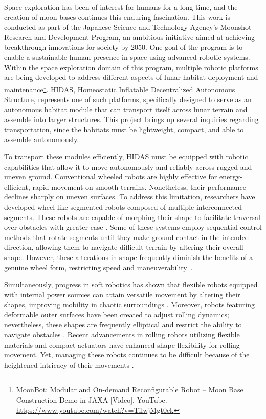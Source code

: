 \documentclass[a4paper, 10pt, conference]{ieeeconf}
\begin{document}
Space exploration has been of interest for humans for a long time, and the creation of moon bases continues this enduring fascination\cite{b17}. This work is conducted as part of the Japanese Science and Technology Agency's Moonshot Research and Development Program, an ambitious initiative aimed at achieving breakthrough innovations for society by 2050. One goal of the program is to enable a sustainable human presence in space using advanced robotic systems. Within the space exploration domain of this program, multiple robotic platforms are being developed to address different aspects of lunar habitat deployment and maintenance\footnote{MoonBot: Modular and On-demand Reconfigurable Robot -- Moon Base Construction Demo in JAXA [Video]. YouTube. \url{https://www.youtube.com/watch?v=TilwjMgt0ek}}. HIDAS, Homeostatic Inflatable Decentralized Autonomous Structure, represents one of such platforms, specifically designed to serve as an autonomous habitat module that can transport itself across lunar terrain and assemble into larger structures. This project brings up several inquiries regarding transportation, since the habitats must be lightweight, compact, and able to assemble autonomously.

To transport these modules efficiently, HIDAS must be equipped with robotic capabilities that allow it to move autonomously and reliably across rugged and uneven ground. Conventional wheeled robots are highly effective for energy-efficient, rapid movement on smooth terrains. Nonetheless, their performance declines sharply on uneven surfaces. To address this limitation, researchers have developed wheel-like segmented robots composed of multiple interconnected segments. These robots are capable of morphing their shape to facilitate traversal over obstacles with greater ease \cite{b1}. Some of these systems employ sequential control methods that rotate segments until they make ground contact in the intended direction, allowing them to navigate difficult terrain by altering their overall shape. However, these alterations in shape frequently diminish the benefits of a genuine wheel form, restricting speed and maneuverability~\cite{b1}.


Simultaneously, progress in soft robotics has shown that flexible robots equipped with internal power sources can attain versatile movement by altering their shapes, improving mobility in chaotic surroundings \cite{b2}. Moreover, robots featuring deformable outer surfaces have been created to adjust rolling dynamics; nevertheless, these shapes are frequently elliptical and restrict the ability to navigate obstacles \cite{b3}. Recent advancements in rolling robots utilizing flexible materials and compact actuators have enhanced shape flexibility for rolling movement. Yet, managing these robots continues to be difficult because of the heightened intricacy of their movements \cite{b4, b5}.
\end{document}
